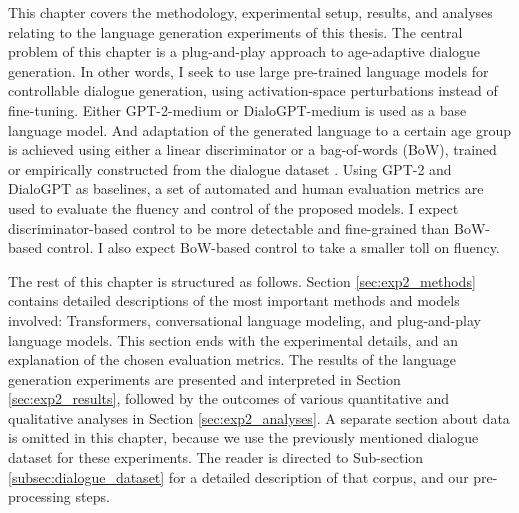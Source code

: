 This chapter covers the methodology, experimental setup, results, and analyses relating to the language generation experiments of this thesis. The central problem of this chapter is a plug-and-play approach to age-adaptive dialogue generation. In other words, I seek to use large pre-trained language models for controllable dialogue generation, using activation-space perturbations instead of fine-tuning. Either GPT-2-medium or DialoGPT-medium is used as a base language model. And adaptation of the generated language to a certain age group is achieved using either a linear discriminator or a bag-of-words (BoW), trained or empirically constructed from the dialogue dataset \citep{love-spoken-bnc-2014}. Using GPT-2 and DialoGPT as baselines, a set of automated and human evaluation metrics are used to evaluate the fluency and control of the proposed models. I expect discriminator-based control to be more detectable and fine-grained than BoW-based control. I also expect BoW-based control to take a smaller toll on fluency.

The rest of this chapter is structured as follows. Section \ref{sec:exp2_methods} contains detailed descriptions of the most important methods and models involved: Transformers, conversational language modeling, and plug-and-play language models. This section ends with the experimental details, and an explanation of the chosen evaluation metrics. The results of the language generation experiments are presented and interpreted in Section \ref{sec:exp2_results}, followed by the outcomes of various quantitative and qualitative analyses in Section \ref{sec:exp2_analyses}. A separate section about data is omitted in this chapter, because we use the previously mentioned dialogue dataset for these experiments. The reader is directed to Sub-section \ref{subsec:dialogue_dataset} for a detailed description of that corpus, and our pre-processing steps.


